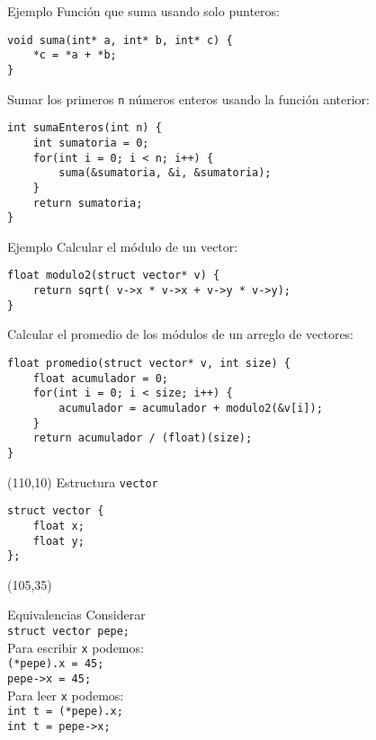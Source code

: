 \documentclass[aspectratio=169]{beamer}
\begin{document}
\begin{frame}[fragile,t]{Ejemplo}
\small
\textcolor{verdeuca}{Función que suma usando solo punteros:}
\begin{verbatim}
void suma(int* a, int* b, int* c) {
    *c = *a + *b;
}
\end{verbatim}
\textcolor{verdeuca}{Sumar los primeros \texttt{n} números enteros usando la función anterior:}
\begin{verbatim}
int sumaEnteros(int n) {
    int sumatoria = 0;
    for(int i = 0; i < n; i++) {
        suma(&sumatoria, &i, &sumatoria);
    }
    return sumatoria;
}
\end{verbatim}
\end{frame}

\begin{frame}[fragile,t]{Ejemplo}
\small
\textcolor{verdeuca}{Calcular el módulo de un vector:}
\begin{verbatim}
float modulo2(struct vector* v) {
    return sqrt( v->x * v->x + v->y * v->y);
}
\end{verbatim}
\textcolor{verdeuca}{Calcular el promedio de los módulos de un arreglo de vectores:}
\begin{verbatim}
float promedio(struct vector* v, int size) {
    float acumulador = 0;
    for(int i = 0; i < size; i++) {
        acumulador = acumulador + modulo2(&v[i]);
    }
    return acumulador / (float)(size);
}
\end{verbatim}
\begin{textblock}{87}(110,10)
\footnotesize
\textcolor{verdeuca}{Estructura \texttt{vector}}
\begin{verbatim}
struct vector {
    float x;
    float y;
};
\end{verbatim}
\end{textblock}
    \begin{textblock}{50}(105,35)
    \begin{block}{\small Equivalencias}
    \small
    \centering
    \textcolor{verdeuca}{Considerar}\\
    \verb|struct vector pepe;|\\
    \vspace{0.1cm}
    \textcolor{verdeuca}{Para escribir \texttt{x} podemos:}\\
    \vspace{0.1cm}
    \verb|(*pepe).x = 45;|\\
    \verb|pepe->x = 45;|\\
    \vspace{0.1cm}
    \textcolor{verdeuca}{Para leer \texttt{x} podemos:}\\
    \vspace{0.1cm}
    \verb|int t = (*pepe).x;|\\
    \verb|int t = pepe->x;|\\
    \end{block}
    \end{textblock}
\end{frame}
\end{document}
